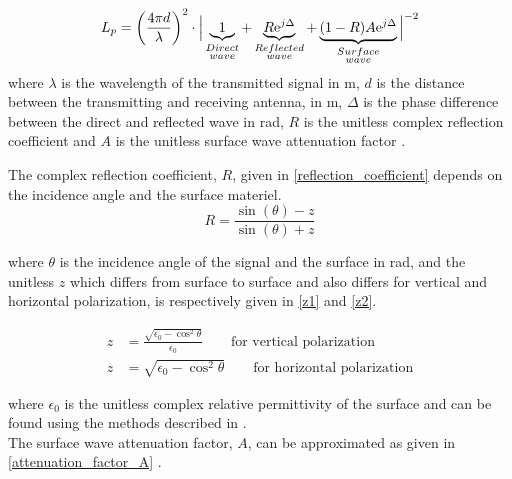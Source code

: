 \begin{equation}
L_p=\left(\frac{4 \pi d}{\lambda}\right)^2 \cdot \Big|\underbrace{1}_{\begin{subarray}{c}Direct\\wave\end{subarray}}+\underbrace{R\text{e}^{j\Delta}}_{\begin{subarray}{c}Reflected\\wave\end{subarray}}+\underbrace{(1-R)A\text{e}^{j\Delta}}_{\begin{subarray}{c}Surface\\wave\end{subarray}}\Big|^{-2} 
\label{ground_wave}
\end{equation}
where
$\lambda$ is the wavelength of the transmitted signal in m, $d$ is the distance between the transmitting and receiving antenna, in m, $\Delta$ is the phase difference between the direct and reflected wave in rad, $R$ is the unitless complex reflection coefficient and $A$ is the unitless surface wave attenuation factor \cite{Chong,Bullington}. 


The complex reflection coefficient, $R$, given in \eqref{reflection_coefficient} depends on the incidence angle and the surface materiel.
\begin{equation}
R = \frac{\sin(\theta)-z}{\sin(\theta)+z}
\label{reflection_coefficient}
\end{equation}

where $\theta$ is the incidence angle of the signal and the surface in rad, and the unitless $z$ which differs from surface to surface and also differs for vertical and horizontal polarization, is respectively given in \eqref{z1} and \eqref{z2}.

\begin{align}
z &= \frac{\sqrt{\epsilon_{0}-\cos^{2}\theta}}{\epsilon_{0}} \qquad \text{for vertical polarization} \label{z1}\\
z &= \sqrt{\epsilon_{0}-\cos^{2}\theta}  \qquad \text{for horizontal polarization}
\label{z2}
\end{align}

where $\epsilon_{0}$ is the unitless complex relative permittivity of the surface and can be found using the methods described in \cite{Kim}.\\
The surface wave attenuation factor, $A$, can be approximated as given in \eqref{attenuation_factor_A} \cite{Chong, Bullington}. 


